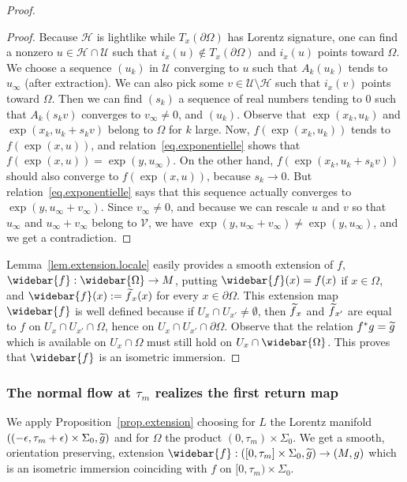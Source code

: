 \documentclass[11pt]{article}
\theoremstyle{definition}
\numberwithin{equation}{section}
\numberwithin{figure}{section}
\numberwithin{table}{section}
\let\oldtilde\tilde
\renewcommand*\tilde[1]{\mathchoice{\widetilde{#1}}{\widetilde{#1}}{\widetilde{#1}}{\oldtilde{#1}}}
\let\oldbar\bar
\renewcommand*{\bar}[1]{\mathchoice{\widebar{#1}}{\widebar{#1}}{\oldbar{#1}}{\oldbar{#1}}}
\renewcommand*{\overline}{\bar}
\begin{document}
\begin{proof}
\begin{proof}
Because ${\mathcal H}$ is lightlike while $T_x(\partial \Omega)$ has Lorentz signature, one can find a nonzero $u \in {\mathcal H} \cap {\mathcal U}$ such that $i_{x}(u) \not \in T_x(\partial \Omega)$ and $i_{x}(u)$ points toward $\Omega$. We choose a sequence $(u_k)$ in $\mathcal{U}$ converging to $u$ such that $A_k(u_k)$ tends to $u_{\infty}$ (after extraction). We can also pick some $v \in {\mathcal{U}}\setminus { \mathcal{H}}$ such that $i_x(v)$ points toward $\Omega$. Then we can find $(s_k)$ a sequence of real numbers tending to $0$ such that $A_k(s_k v)$ converges to $v_{\infty} \not =0$, and $(u_k)$. Observe that $\exp(x_k,u_k)$ and $\exp(x_k, u_k + s_kv)$ belong to $\Omega$ for $k$ large. Now, $f(\exp(x_k,u_k))$ tends to $f(\exp(x,u))$, and relation~\eqref{eq.exponentielle} shows that $f(\exp(x,u))=\exp(y,u_{\infty})$. On the other hand, $f(\exp(x_k, u_k+s_k v))$ should also converge to $f(\exp(x,u))$, because $s_k \to 0$. But relation~\eqref{eq.exponentielle} says that this sequence actually converges to $\exp(y,u_{\infty}+v_{\infty})$. Since $v_{\infty} \not =0$, and because we can rescale $u$ and $v$ so that $u_{\infty}$ and $u_{\infty}+v_{\infty}$ belong to ${\mathcal V}$, we have $\exp(y,u_{\infty}+v_{\infty}) \not = \exp(y,u_{\infty})$, and we get a contradiction.
\end{proof}



Lemma~\ref{lem.extension.locale} easily provides a smooth extension of $f$, $\overline{f}: \overline{\Omega} \to M $, putting $\overline{f}(x)=f(x)$ if $x \in \Omega$, and $\overline{f}(x):=\tilde{f}_x(x)$ for every $x \in \partial \Omega$. This extension map $\overline{f}$ is well defined because if $U_x \cap U_{x'} \not = \emptyset$, then $\tilde{f}_x$ and $\tilde{f}_{x'}$ are equal to $f$ on $U_x \cap U_{x'}\cap \Omega$, hence on $U_x \cap U_{x'}\cap \partial \Omega$. Observe that the relation $f^*g=\tilde{g}$ which is available on $U_x \cap \Omega$ must still hold on $U_x \cap \overline{\Omega}$. This proves that $\overline{f}$ is an isometric immersion.
\end{proof}


\subsubsection{The normal flow at \texorpdfstring{$\tau_m$}{taum} realizes the first return map} We apply Proposition~\ref{prop.extension} choosing for $L$ the Lorentz manifold $((- \epsilon, \tau_m + \epsilon) \times \Sigma_0, \tilde{g})$ and for ${\Omega}$ the product $(0,\tau_m) \times \Sigma_0$. We get a smooth, orientation preserving, extension $\overline{f} : ([0,\tau_m] \times \Sigma_0, \tilde{g}) \to (M,g)$ which is an isometric immersion coinciding with $f$ on $[0,\tau_m) \times \Sigma_0$.
\end{document}
